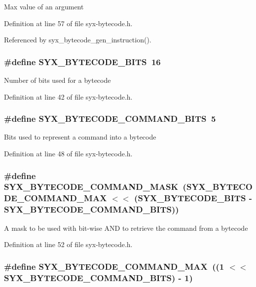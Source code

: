 Max value of an argument 

Definition at line 57 of file syx-bytecode.h.

Referenced by syx\_\-bytecode\_\-gen\_\-instruction().\hypertarget{syx-bytecode_8h_f8aefeca70ebc9c5d4833644b92e4d00}{
\subsubsection{\setlength{\rightskip}{0pt plus 5cm}\#define SYX\_\-BYTECODE\_\-BITS~16}}
\label{syx-bytecode_8h_f8aefeca70ebc9c5d4833644b92e4d00}


Number of bits used for a bytecode 

Definition at line 42 of file syx-bytecode.h.\hypertarget{syx-bytecode_8h_7bd85efbfd4cd98e34446ca7ab1369ee}{
\subsubsection{\setlength{\rightskip}{0pt plus 5cm}\#define SYX\_\-BYTECODE\_\-COMMAND\_\-BITS~5}}
\label{syx-bytecode_8h_7bd85efbfd4cd98e34446ca7ab1369ee}


Bits used to represent a command into a bytecode 

Definition at line 48 of file syx-bytecode.h.\hypertarget{syx-bytecode_8h_ce0a31c234c06b8e49fc61c5ce4ef9ed}{
\subsubsection{\setlength{\rightskip}{0pt plus 5cm}\#define SYX\_\-BYTECODE\_\-COMMAND\_\-MASK~(SYX\_\-BYTECODE\_\-COMMAND\_\-MAX $<$$<$ (SYX\_\-BYTECODE\_\-BITS - SYX\_\-BYTECODE\_\-COMMAND\_\-BITS))}}
\label{syx-bytecode_8h_ce0a31c234c06b8e49fc61c5ce4ef9ed}


A mask to be used with bit-wise AND to retrieve the command from a bytecode 

Definition at line 52 of file syx-bytecode.h.\hypertarget{syx-bytecode_8h_8fc4c49360ef9a755b02bf82693b45dd}{
\subsubsection{\setlength{\rightskip}{0pt plus 5cm}\#define SYX\_\-BYTECODE\_\-COMMAND\_\-MAX~((1 $<$$<$ SYX\_\-BYTECODE\_\-COMMAND\_\-BITS) - 1)}}
\label{syx-bytecode_8h_8fc4c49360ef9a755b02bf82693b45dd}


